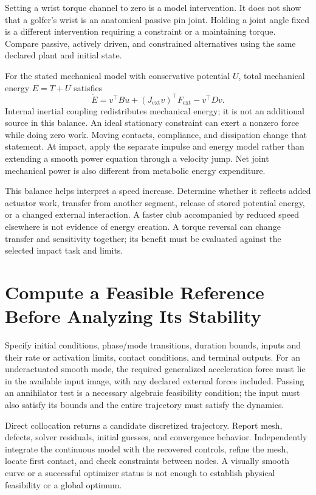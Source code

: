 Setting a wrist torque channel to zero is a model intervention. It does not show that a golfer's wrist is an anatomical passive pin joint. Holding a joint angle fixed is a different intervention requiring a constraint or a maintaining torque. Compare passive, actively driven, and constrained alternatives using the same declared plant and initial state.

For the stated mechanical model with conservative potential $U$, total mechanical energy $E=T+U$ satisfies
\begin{equation}
\dot E=v^\top B u+(J_{\mathrm{ext}}v)^\top F_{\mathrm{ext}}-v^\top Dv .
\end{equation}
Internal inertial coupling redistributes mechanical energy; it is not an additional source in this balance. An ideal stationary constraint can exert a nonzero force while doing zero work. Moving contacts, compliance, and dissipation change that statement. At impact, apply the separate impulse and energy model rather than extending a smooth power equation through a velocity jump. Net joint mechanical power is also different from metabolic energy expenditure.

This balance helps interpret a speed increase. Determine whether it reflects added actuator work, transfer from another segment, release of stored potential energy, or a changed external interaction. A faster club accompanied by reduced speed elsewhere is not evidence of energy creation. A torque reversal can change transfer and sensitivity together; its benefit must be evaluated against the selected impact task and limits.

\section{Compute a Feasible Reference Before Analyzing Its Stability}

Specify initial conditions, phase/mode transitions, duration bounds, inputs and their rate or activation limits, contact conditions, and terminal outputs. For an underactuated smooth mode, the required generalized acceleration force must lie in the available input image, with any declared external forces included. Passing an annihilator test is a necessary algebraic feasibility condition; the input must also satisfy its bounds and the entire trajectory must satisfy the dynamics.

Direct collocation returns a candidate discretized trajectory. Report mesh, defects, solver residuals, initial guesses, and convergence behavior. Independently integrate the continuous model with the recovered controls, refine the mesh, locate first contact, and check constraints between nodes. A visually smooth curve or a successful optimizer status is not enough to establish physical feasibility or a global optimum.

